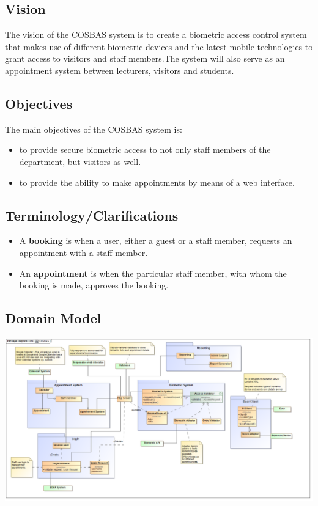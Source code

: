 \documentclass[11pt,a4paper,titlepage]{article}
\begin{document}
	\subsection{Vision}
	The vision of the COSBAS system is to create a biometric access control system that makes use of different biometric devices and the latest mobile technologies to grant access to visitors and staff members.The system will also serve as an appointment system between lecturers, visitors and students.

	\subsection{Objectives}
	The main objectives of the COSBAS system is:
	\begin{itemize}	
 		\item to provide secure biometric access to not only staff members of the department, but visitors as well.
		\item to provide the ability to make appointments by means of a web interface. 
	\end{itemize}

	\subsection{Terminology/Clarifications}
	\begin{itemize}	
 		\item A \textbf{booking} is when a user, either a guest or a staff member, requests an appointment with a staff member. 
		\item An \textbf{appointment} is when the particular staff member, with whom the booking is made, approves the booking.
	\end{itemize}

\begin{landscape}
	\section{Domain Model}	
	\includegraphics[width=\linewidth]{COSBAS_Domain}
	\end{landscape}
	
\end{document}
